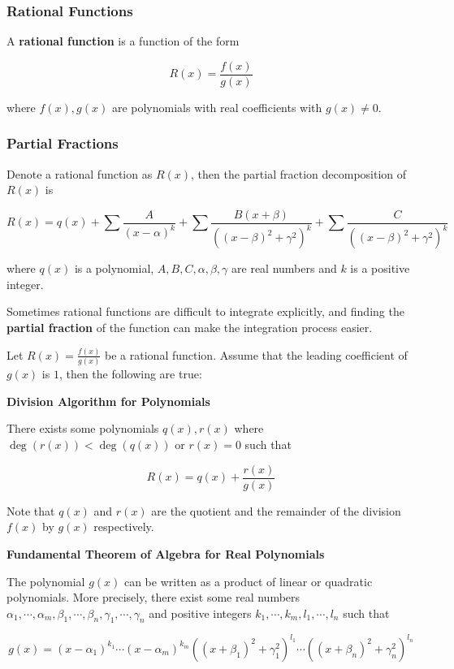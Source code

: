 \documentclass[a4paper,12pt]{article}
\begin{document}
\subsubsection{Rational Functions}
\begin{dft}
  A \textbf{rational function} is a function of the form

  $$R(x)=\frac{f(x)}{g(x)}$$

  where $f(x),g(x)$ are polynomials with real coefficients with $g(x)\neq 0$.
\end{dft}

\subsubsection{Partial Fractions}
\begin{dft}
  Denote a rational function as $R(x)$, then the partial fraction decomposition of $R(x)$ is

  $$R(x)=q(x)+\sum\frac{A}{(x-\alpha)^{k}}+\sum\frac{B(x+\beta)}{((x-\beta)^{2}+\gamma^{2})^{k}}+\sum\frac{C}{((x-\beta)^{2}+\gamma^{2})^{k}}$$\s

  where $q(x)$ is a polynomial, $A,B,C,\alpha,\beta,\gamma$ are real numbers and $k$ is a positive integer.
\end{dft}\n

Sometimes rational functions are difficult to integrate explicitly, and finding the \textbf{partial fraction} of the function can make the integration process easier.\n

\begin{thm}
  Let $R(x)=\frac{f(x)}{g(x)}$ be a rational function. Assume that the leading coefficient of $g(x)$ is $1$, then the following are true:

  \begin{alist}
    \item \textbf{Division Algorithm for Polynomials}\n

    There exists some polynomials $q(x),r(x)$ where $\deg(r(x))<\deg(q(x))$ or $r(x)=0$ such that

    $$R(x)=q(x)+\frac{r(x)}{g(x)}$$\s

    Note that $q(x)$ and $r(x)$ are the quotient and the remainder of the division $f(x)$ by $g(x)$ respectively.

    \item \textbf{Fundamental Theorem of Algebra for Real Polynomials}\n

    The polynomial $g(x)$ can be written as a product of linear or quadratic polynomials. More precisely, there exist some real numbers $\alpha_{1},\cdots,\alpha_{m},\beta_{1},\cdots,\beta_{n},\gamma_{1},\cdots,\gamma_{n}$ and positive integers $k_{1},\cdots,k_{m},l_{1},\cdots,l_{n}$ such that

    $$g(x)=(x-\alpha_{1})^{k_{1}}\cdots(x-\alpha_{m})^{k_{m}}((x+\beta_{1})^{2}+\gamma_{1}^{2})^{l_{1}}\cdots((x+\beta_{n})^{2}+\gamma_{n}^{2})^{l_{n}}$$
  \end{alist}
\end{thm}\n
\end{document}
